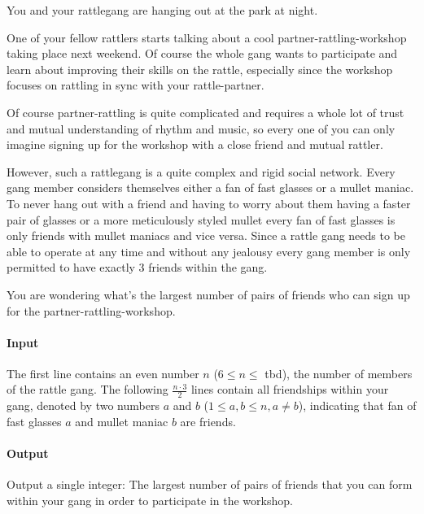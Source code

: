 



\makeheader

You and your rattlegang are hanging out at the park at night. 

One of your fellow rattlers starts talking about a cool partner-rattling-workshop taking place next weekend.
Of course the whole gang wants to participate and learn about improving their skills on the rattle,
especially since the workshop focuses on rattling in sync with your rattle-partner. 

Of course partner-rattling is quite complicated and requires a whole lot of trust and mutual understanding of rhythm and music,
so every one of you can only imagine signing up for the workshop with a close friend and mutual rattler. 

However, such a rattlegang is a quite complex and rigid social network.
Every gang member considers themselves either a fan of fast glasses or a mullet maniac.
To never hang out with a friend and having to worry about them having a faster pair of glasses or a more meticulously styled mullet every fan of fast glasses is only friends with mullet maniacs and vice versa.
Since a rattle gang needs to be able to operate at any time and without any jealousy every gang member is only permitted to have exactly 3 friends within the gang.

You are wondering what's the largest number of pairs of friends who can sign up for the partner-rattling-workshop. 

\paragraph*{Input}

The first line contains an even number $n$ ($6 \leq n \leq $ tbd), the number of members of the rattle gang.
The following $\frac{n \cdot 3}{2}$ lines contain all friendships within your gang, denoted by two numbers $a$ and $b$ ($1 \leq a,b \leq n, a \neq b$), indicating that fan of fast glasses $a$ and mullet maniac $b$ are friends.

\paragraph*{Output}

Output a single integer: The largest number of pairs of friends that you can form within your gang in order to participate in the workshop. 

\begin{samples}
\end{samples}

